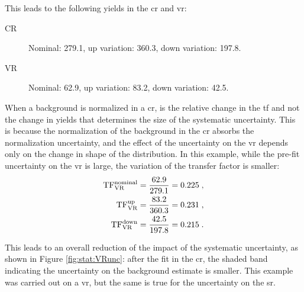 \begin{itemize}
This leads to the following yields in the \gls{cr} and \gls{vr}:

\begin{description}
\item[CR] Nominal: 279.1, up variation: 360.3, down variation: 197.8.
\item[VR] Nominal: 62.9, up variation: 83.2, down variation: 42.5.
\end{description}

\noindent When a background is normalized in a \gls{cr}, is the relative change in the \gls{tf} and not the change in yields that determines the size of the systematic uncertainty.
This is because the normalization of the background in the \gls{cr} absorbs the normalization uncertainty, and the effect of the uncertainty on the \gls{vr} depends only on the change in shape of the distribution. 
In this example, while the pre-fit uncertainty on the \gls{vr} is large, the variation of the transfer factor is smaller:
\begin{equation}
\begin{split}
\rm TF^{nominal}_{VR} &= \frac{62.9}{279.1} = 0.225 \; ,\\
\rm TF^{up}_{VR} &= \frac{83.2}{360.3} = 0.231 \; , \\
\rm TF^{down}_{VR} &= \frac{42.5}{197.8} = 0.215 \; . \\
\end{split}
\end{equation}

\noindent This leads to an overall reduction of the impact of the systematic uncertainty, as shown in Figure \ref{fig:stat:VRunc}:  
after the fit in the \gls{cr}, the shaded band indicating the uncertainty on the background estimate is smaller. 
This example was carried out on a \gls{vr}, but the same is true for the uncertainty on the \gls{sr}.


\end{itemize}
